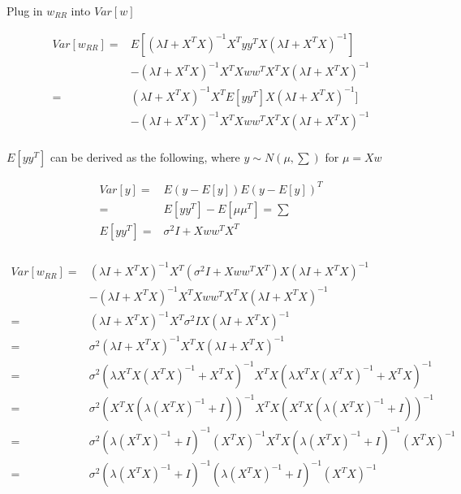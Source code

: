 \documentclass[11pt]{report}
\begin{document}
\justify
Plug in $w_{RR}$ into $Var[w]$

\begin{equation*}
\begin{split}
Var[w_{RR}] =  & E[(\lambda I + X^TX)^{-1}X^Ty  y^T X (\lambda I + X^TX)^{-1}] \\
& - (\lambda I + X^TX)^{-1}X^TXw w^T X^T X (\lambda I + X^TX)^{-1}\\
= &(\lambda I + X^TX)^{-1}X^T E[y y^T] X (\lambda I + X^TX)^{-1}] \\
& - (\lambda I + X^TX)^{-1}X^TXw w^T X^T X (\lambda I + X^TX)^{-1}\\
\end{split} 
\end{equation*}

\justify
$E[yy^T]$ can be derived as the following, where $y \sim N(\mu, \sum)$ for $\mu = Xw$

\begin{equation*}
\begin{split}
Var[y] =&  E(y - E[y]) E(y - E[y])^T \\
=& E[y y^T] - E[\mu \mu^T] = \sum \\
E[yy^T] =& \sigma^2I + Xww^TX^T\\
\end{split} 
\end{equation*}


\begin{equation*}
\begin{split}
Var[w_{RR}] = &(\lambda I + X^TX)^{-1}X^T (\sigma^2I + Xww^TX^T) X (\lambda I + X^TX)^{-1} \\
& - (\lambda I + X^TX)^{-1}X^TXw w^T X^T X (\lambda I + X^TX)^{-1}\\
= &(\lambda I + X^TX)^{-1}X^T \sigma^2I X (\lambda I + X^TX)^{-1}  \\
= &\sigma^2 (\lambda I + X^TX)^{-1}X^T X (\lambda I + X^TX)^{-1}  \\
= &\sigma^2 (\lambda X^TX(X^TX)^{-1} + X^TX)^{-1}X^T X(\lambda X^TX(X^TX)^{-1} + X^TX)^{-1}  \\
= &\sigma^2 (X^TX(\lambda (X^TX)^{-1} + I))^{-1}X^T X (X^TX(\lambda (X^TX)^{-1} + I))^{-1}  \\
= &\sigma^2 (\lambda (X^TX)^{-1} + I)^{-1} (X^TX)^{-1} X^T X (\lambda (X^TX)^{-1} + I)^{-1} (X^TX)^{-1} \\
= &\sigma^2 (\lambda (X^TX)^{-1} + I)^{-1} (\lambda (X^TX)^{-1} + I)^{-1} (X^TX)^{-1} \\
\\
\end{split} 
\end{equation*}
\end{document}
